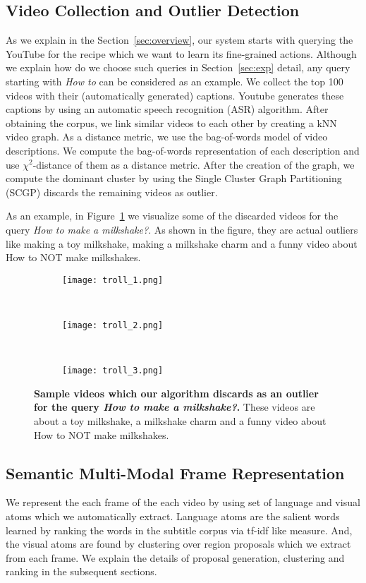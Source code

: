 \subsection{Video Collection and Outlier Detection}
\label{filter}
As we explain in the Section~\ref{sec:overview}, our system starts with querying the YouTube for the recipe which we want to learn its fine-grained actions. Although we explain how do we choose such queries in Section~\ref{sec:exp} detail, any query starting with \emph{How to} can be considered as an example. We collect the top 100 videos with their (automatically generated) captions. Youtube generates these captions by using an automatic speech recognition (ASR) algorithm. After obtaining the corpus, we link similar videos to each other by creating a kNN video graph. As a distance metric, we use the bag-of-words model of video descriptions. We compute the bag-of-words representation of each description and use $\chi^2$-distance of them as a distance metric. After the creation of the graph, we compute the dominant cluster by using the Single Cluster Graph Partitioning (SCGP)\cite{scgp} discards the remaining videos as outlier.

As an example, in Figure~\ref{outliers} we visualize some of the discarded videos for the query \emph{How to make a milkshake?}. As shown in the figure, they are actual outliers like making a toy milkshake, making a milkshake charm and a funny video about How to NOT make milkshakes.
\begin{figure}[ht]
  \begin{subfigure}[b]{0.16\textwidth}
    \texttt{[image: troll\_1.png]}
  \end{subfigure}~
  \begin{subfigure}[b]{0.16\textwidth}
    \texttt{[image: troll\_2.png]}
  \end{subfigure}~
  \begin{subfigure}[b]{0.16\textwidth}
    \texttt{[image: troll\_3.png]}
  \end{subfigure}
\caption{\textbf{Sample videos which our algorithm discards as an outlier for the query \emph{How to make a milkshake?}.} These videos are about a toy milkshake, a milkshake charm and a funny video about How to NOT make milkshakes.}
\label{outliers}
\end{figure}

\subsection{Semantic Multi-Modal Frame Representation}
We represent the each frame of the each video by using set of language and visual atoms which we automatically extract. Language atoms are the salient words learned by ranking the words in the subtitle corpus via tf-idf like measure. And, the visual atoms are found by clustering over region proposals which we extract from each frame. We explain the details of proposal generation, clustering and ranking in the subsequent sections.

